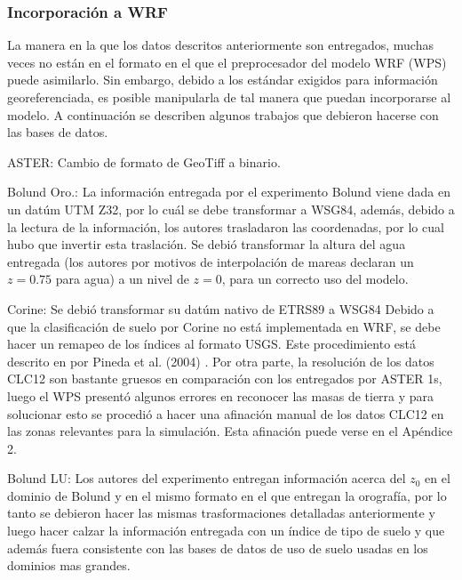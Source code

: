 \subsubsection{Incorporación a WRF}
La manera en la que los datos descritos anteriormente son entregados, muchas veces no están en el formato en el que el preprocesador del modelo WRF (WPS) puede asimilarlo. Sin embargo, debido a los estándar exigidos para información georeferenciada, es posible manipularla de tal manera que puedan incorporarse al modelo. A continuación se describen algunos trabajos que debieron hacerse con las bases de datos.
\begin{itemize*}
	\item ASTER: Cambio de formato de GeoTiff a binario.
	\item Bolund Oro.: La información entregada por el experimento Bolund viene dada en un datúm UTM Z32, por lo cuál se debe transformar a WSG84, además, debido a la lectura de la información, los autores trasladaron las coordenadas, por lo cual hubo que invertir esta traslación. Se debió transformar la altura del agua entregada (los autores por motivos de interpolación de mareas declaran un $z=0.75$ para agua) a un nivel de $z=0$, para un correcto uso del modelo. 
	\item Corine: Se debió transformar su datúm nativo de ETRS89 a WSG84 Debido a que la clasificación de suelo por Corine no está implementada en WRF, se debe hacer un remapeo de los índices al formato USGS. Este procedimiento está descrito en por Pineda et al. (2004) \cite{Pineda2004}. Por otra parte, la resolución de los datos CLC12 son bastante gruesos en comparación con los entregados por ASTER 1s, luego el WPS presentó algunos errores en reconocer las masas de tierra y para solucionar esto se procedió a hacer una afinación manual de los datos CLC12 en las zonas relevantes para la simulación. Esta afinación puede verse en el Apéndice 2.
	\item Bolund LU: Los autores del experimento entregan información acerca del $z_0$ en el dominio de Bolund y en el mismo formato en el que entregan la orografía, por lo tanto se debieron hacer las mismas trasformaciones detalladas anteriormente y luego hacer calzar la información entregada con un índice de tipo de suelo y que además fuera consistente con las bases de datos de uso de suelo usadas en los dominios mas grandes.
\end{itemize*}
